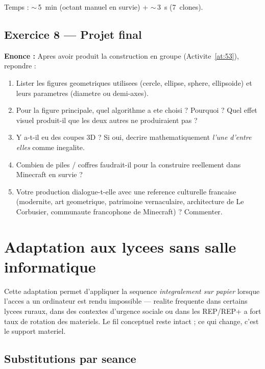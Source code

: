 \documentclass[12pt,a4paper]{scrartcl}
\begin{document}
Temps : $\sim$\,5~min (octant manuel en survie) + $\sim$\,3~s (7~clones).

\subsection*{Exercice 8 --- Projet final}
\textbf{Enonce :} Apres avoir produit la construction en groupe (Activite~\ref{at:53}), repondre :
\begin{enumerate}[label=(\arabic*),leftmargin=1.7em,itemsep=0.15em,topsep=0.2em,nosep]
  \item Lister les figures geometriques utilisees (cercle, ellipse, sphere, ellipsoide) et leurs parametres (diametre ou demi-axes).
  \item Pour la figure principale, quel algorithme a ete choisi ? Pourquoi ? Quel effet visuel produit-il que les deux autres ne produiraient pas ?
  \item Y a-t-il eu des coupes 3D ? Si oui, decrire mathematiquement \emph{l'une d'entre elles} comme inegalite.
  \item Combien de piles / coffres faudrait-il pour la construire reellement dans Minecraft en survie ?
  \item Votre production dialogue-t-elle avec une reference culturelle francaise (modernite, art geometrique, patrimoine vernaculaire, architecture de Le Corbusier, communaute francophone de Minecraft) ? Commenter.
\end{enumerate}

\newpage
\section{Adaptation aux lycees sans salle informatique}\label{ap:adapt-analog}

Cette adaptation permet d'appliquer la sequence \emph{integralement sur papier} lorsque l'acces a un ordinateur est rendu impossible --- realite frequente dans certains lycees ruraux, dans des contextes d'urgence sociale ou dans les REP/REP+ a fort taux de rotation des materiels. Le fil conceptuel reste intact ; ce qui change, c'est le support materiel.

\subsection{Substitutions par seance}
\end{document}
